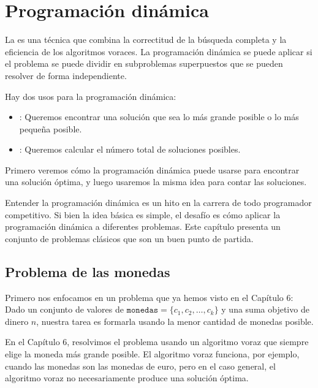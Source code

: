 \chapter{Programación dinámica}


La 
es una técnica que combina la correctitud
de la búsqueda completa y la eficiencia
de los algoritmos voraces.
La programación dinámica se puede aplicar si el
problema se puede dividir en subproblemas superpuestos
que se pueden resolver de forma independiente.

Hay dos usos para la programación dinámica:

\begin{itemize}
    \item
          :
          Queremos encontrar una solución que sea
          lo más grande posible o lo más pequeña posible.
    \item
          :
          Queremos calcular el número total de
          soluciones posibles.
\end{itemize}

Primero veremos cómo la programación dinámica puede
usarse para encontrar una solución óptima,
y luego usaremos la misma idea para
contar las soluciones.

Entender la programación dinámica es un hito
en la carrera de todo programador competitivo.
Si bien la idea básica es simple,
el desafío es cómo aplicar
la programación dinámica a diferentes problemas.
Este capítulo presenta un conjunto de problemas clásicos
que son un buen punto de partida.

\section{Problema de las monedas}

Primero nos enfocamos en un problema que ya
hemos visto en el Capítulo 6:
Dado un conjunto de valores de $\texttt{monedas} = \{c_1,c_2,\ldots,c_k\}$
y una suma objetivo de dinero $n$, nuestra tarea es
formarla usando la menor cantidad de monedas posible.

En el Capítulo 6, resolvimos el problema usando un
algoritmo voraz que siempre elige la moneda
más grande posible.
El algoritmo voraz funciona, por ejemplo,
cuando las monedas son las monedas de euro,
pero en el caso general, el algoritmo voraz
no necesariamente produce una solución óptima.

